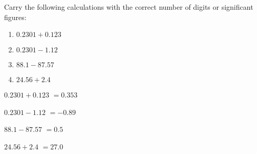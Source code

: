 \documentclass[main.tex]{subfiles}
\begin{document}
\begin{multicols*}{2}
\begin{question}[ID=\the\value{numA}]
Carry the following calculations with the correct number of digits or significant figures:
  \begin{multicols}{2} \noindent
  \begin{enumerate} [topsep=0pt, partopsep=1pt, label=(\alph*), leftmargin=1cm]
  \item $0.2301+0.123$	 \iffalse $0.353$ \fi
  \item $0.2301-1.12$	\iffalse $-0.89$ \fi
    \item $ 88.1-87.57$	\iffalse $=0.5$ \fi
  \item $24.56+2.4$	\iffalse $=27.0$ \fi
  \end{enumerate}\end{multicols}
\end{question}
\begin{solution}
\begin{inparaenum}[(a)]
  \item $0.2301+0.123$	  $=0.353$  
    \item $0.2301-1.12$	  $=-0.89$  
        \item $ 88.1-87.57$	  $=0.5$  
          \item $24.56+2.4$	  $=27.0$  
  \end{inparaenum}
\hspace{0.1cm}\end{solution}%



\end{multicols*}
\end{document}
